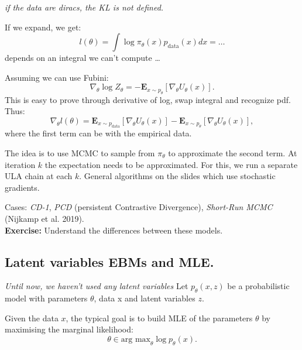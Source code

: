 \documentclass{article}
\begin{document}
    \textit{if the data are diracs, the KL is not defined.}

    If we expand, we get:
    \begin{equation} \label{eq:}
      l(\theta) = \int \log \pi_\theta(x) p_\text{data}(x) dx = \dots
    \end{equation}
    depends on an integral we can't compute \ldots

    Assuming we can use Fubini:
    \begin{equation} \label{eq:}
      \nabla_\theta \log Z_\theta = - \mathbf{E}_{x \sim p_\theta} \left[ \nabla_\theta U_\theta(x) \right].
    \end{equation}
    This is easy to prove through derivative of log, swap integral and recognize pdf.
    Thus:
    \begin{equation} \label{eq:}
      \nabla_\theta l(\theta) = \mathbf{E}_{x \sim p_\text{data}} \left[ \nabla_\theta U_\theta(x) \right] - \mathbf{E}_{x \sim p_\theta} \left[ \nabla_\theta U_\theta(x) \right],
    \end{equation}
    where the first term can be  with the empirical data.

    The idea is to use MCMC to sample from $\pi_\theta$ to approximate the second term.
    At iteration $k$ the expectation needs to be approximated. For this, we run a separate ULA chain at each $k$.
    General algorithms on the slides which use stochastic gradients.

    Cases: \textit{CD-1}, \textit{PCD} (persistent Contrastive Divergence), \textit{Short-Run MCMC} (Nijkamp et al. 2019).
    \\
    \textbf{Exercise:} Understand the differences between these models.

    \subsection{Latent variables EBMs and MLE.}

    \textit{Until now, we haven't used any latent variables}
    Let $p_\theta(x,z)$ be a probabilistic model with parameters $\theta$, data x and latent variables $z$.

    Given the data $x$, the typical goal is to build MLE of the parameters $\theta$ by maximising the marginal likelihood:
    \begin{equation} \label{eq:}
      \theta \in \text{arg max}_\theta \log p_\theta(x).
    \end{equation}
\end{document}

